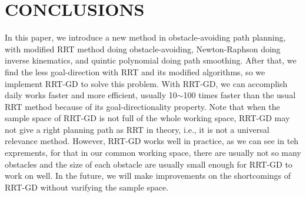 \documentclass[letterpaper, 10 pt, conference]{ieeeconf}  %
\begin{document}
\section{CONCLUSIONS}

In this paper, we introduce a new method in obstacle-avoiding path planning, with modified RRT method doing obstacle-avoiding, Newton-Raphson doing inverse kinematics, and quintic polynomial doing path smoothing. After that, we find the less goal-direction with RRT and its modified algorithms, so we implement RRT-GD to solve this problem. With RRT-GD, we can accomplish daily works faster and more efficient, usually 10$\sim$100 times faster than the usual RRT method because of its goal-directionality property. Note that when the sample space of RRT-GD is not full of the whole working space, RRT-GD may not give a right planning path as RRT in theory, i.e., it is not a universal relevance method. However, RRT-GD works well in practice, as we can see in teh exprements, for that in our common working space, there are usually not so many obstacles and the size of each obstacle are usually small enough for RRT-GD to work on well. In the future, we will make improvements on the shortcomings of RRT-GD without varifying the sample space.

\addtolength{\textheight}{-12cm}   %










\end{document}
